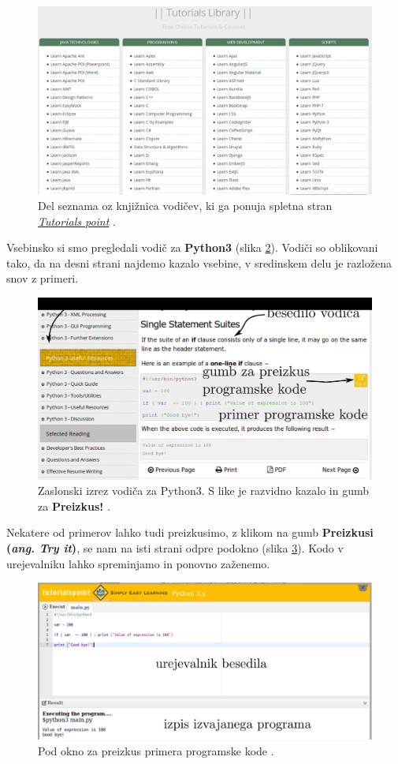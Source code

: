\begin{figure}[h!]
  \centering
    \includegraphics [width=0.65\linewidth, keepaspectratio =
   1] {./images/sc_web/tutpoint_lib-v01.jpg}
   \caption{Del seznama oz knjižnica vodičev, ki ga ponuja spletna
     stran \emph{\href{http://www.tutorialspoint.com/}{Tutorials
         point}} \cite{web:tutorialspoint}.}
    \label{fig:web:tutpoint:lib}
\end{figure}

Vsebinsko si smo pregledali vodič za \textbf{Python3} (slika
\ref{fig:web:tutpoint:tut01}). Vodiči so oblikovani tako, da na desni
strani najdemo kazalo vsebine, v sredinskem delu je razložena snov z
primeri.

\begin{figure}[h!]
  \centering
    \includegraphics [width=0.65\linewidth, keepaspectratio =
   1] {./images/sc_web/tutpoint_tutP3-v01.jpg}
   \caption{Zaslonski izrez vodiča za Python3. S like je razvidno
     kazalo in gumb za \textbf{Preizkus!} \cite{web:tutorialspoint}.}
    \label{fig:web:tutpoint:tut01}
\end{figure}

Nekatere od primerov lahko tudi preizkusimo, z klikom na gumb
\textbf{Preizkusi (\emph{ang. Try it})}, se nam na isti strani odpre
podokno (slika \ref{fig:web:tutpoint:tut02}). Kodo v urejevalniku
lahko spreminjamo in ponovno zaženemo.

\begin{figure}[h!]
  \centering
    \includegraphics [width=0.65\linewidth, keepaspectratio =
   1] {./images/sc_web/tutpoint_tutP3-v02.jpg}
   \caption{Pod okno za preizkus primera programske kode
     \cite{web:tutorialspoint}.}
    \label{fig:web:tutpoint:tut02}
\end{figure}

